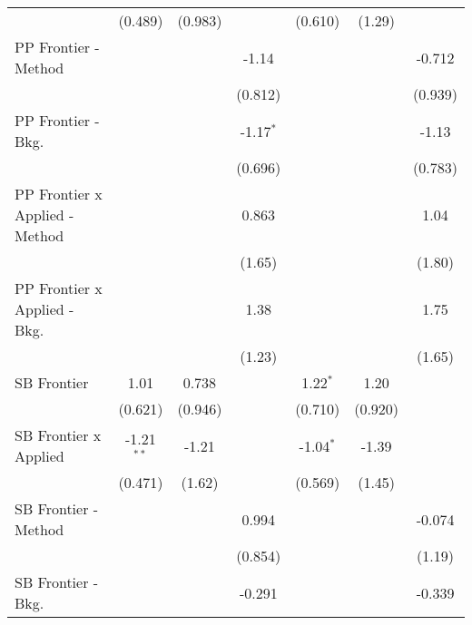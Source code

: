 \begin{tabular}{lcccccc}
                                  & (0.489)       & (0.983)       &               & (0.610)       & (1.29)        &   \\   
   PP Frontier - Method           &               &               & -1.14         &               &               & -0.712\\   
                                  &               &               & (0.812)       &               &               & (0.939)\\   
   PP Frontier - Bkg.             &               &               & -1.17$^{*}$   &               &               & -1.13\\   
                                  &               &               & (0.696)       &               &               & (0.783)\\   
   PP Frontier x Applied - Method &               &               & 0.863         &               &               & 1.04\\   
                                  &               &               & (1.65)        &               &               & (1.80)\\   
   PP Frontier x Applied - Bkg.   &               &               & 1.38          &               &               & 1.75\\   
                                  &               &               & (1.23)        &               &               & (1.65)\\   
   SB Frontier                    & 1.01          & 0.738         &               & 1.22$^{*}$    & 1.20          &   \\   
                                  & (0.621)       & (0.946)       &               & (0.710)       & (0.920)       &   \\   
   SB Frontier x Applied          & -1.21$^{**}$  & -1.21         &               & -1.04$^{*}$   & -1.39         &   \\   
                                  & (0.471)       & (1.62)        &               & (0.569)       & (1.45)        &   \\   
   SB Frontier - Method           &               &               & 0.994         &               &               & -0.074\\   
                                  &               &               & (0.854)       &               &               & (1.19)\\   
   SB Frontier - Bkg.             &               &               & -0.291        &               &               & -0.339\\   

\end{tabular}
